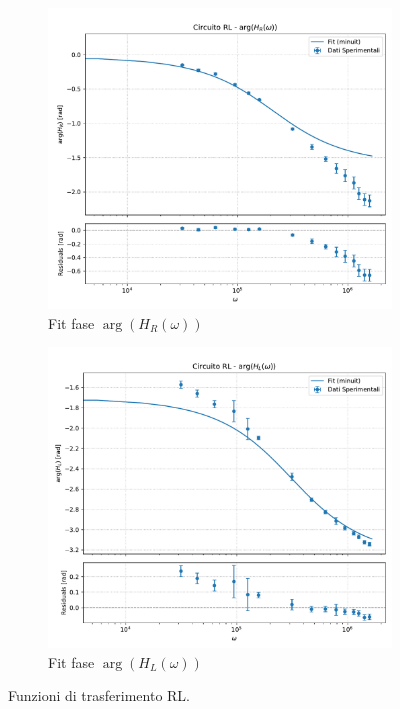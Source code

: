 \documentclass[a4paper]{article}
\begin{document}
\begin{figure}[htbp]
    \vspace{\baselineskip}

    \begin{subfigure}[b]{0.495\textwidth}
        \centering
        \includegraphics[width=\linewidth]{grafici/rl_fase_hr.pdf}
        \caption{Fit fase $\arg(H_R(\omega))$}
        \label{fig:rl_fase_hr}
    \end{subfigure}
    \hfill
    \begin{subfigure}[b]{0.495\textwidth}
        \centering
        \includegraphics[width=\linewidth]{grafici/rl_fase_hl.pdf}
        \caption{Fit fase $\arg(H_L(\omega))$}
        \label{fig:rl_fase_hl}
    \end{subfigure}

    \caption{Funzioni di trasferimento RL.}
    \label{fig:funzioni_trasferimento_rl}
\end{figure}
\end{document}
